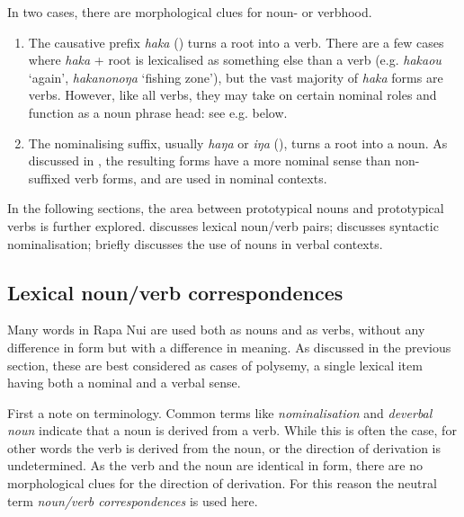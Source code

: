 In two cases, there are morphological clues for noun- or verbhood.

\begin{enumerate}
\item 
The causative prefix \textit{haka} () turns a root into a verb. There are a few cases where \textit{haka} + root is lexicalised as something else than a verb (e.g. \textit{haka{\ꞌ}ou} ‘again’, \textit{hakanonoŋa} ‘fishing zone’), but the vast majority of \textit{haka} forms are verbs. However, like all verbs, they may take on certain nominal roles and function as a noun phrase head: see e.g.  below.

\item 
The nominalising suffix, usually \textit{haŋa} or \textit{iŋa} (), turns a root into a noun. As discussed in , the resulting forms have a more nominal sense than non-suffixed verb forms, and are used in nominal contexts.

\end{enumerate}

In the following sections, the area between prototypical nouns and prototypical verbs is further explored.  discusses lexical noun/verb pairs;  discusses syntactic nominalisation;  briefly discusses the use of nouns in verbal contexts.

\subsection{Lexical noun/verb correspondences}\label{sec:3.2.2}
Many words in Rapa Nui are used both as nouns and as verbs, without any difference in form but with a difference in meaning. As discussed in the previous section, these are best considered as cases of polysemy, a single lexical item having both a nominal and a verbal sense. 

First a note on terminology. Common terms like \textit{nominalisation} and \textit{deverbal noun} indicate that a noun is derived from a verb. While this is often the case, for other words the verb is derived from the noun, or the direction of derivation is undetermined. As the verb and the noun are identical in form, there are no morphological clues for the direction of derivation. For this reason the neutral term \textit{noun/verb correspondences} is used here. 

